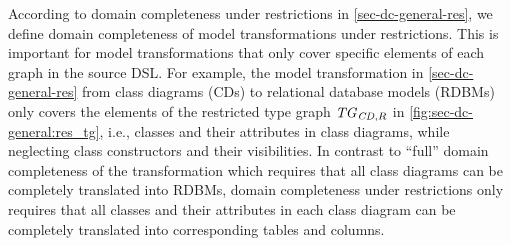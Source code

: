 % 
% 
% 
% 

According to domain completeness under restrictions in \cref{sec-dc-general-res}, we define domain completeness of model transformations under restrictions.
This is important for model transformations that only cover specific elements of each graph in the source DSL.
For example, the model transformation in \cref{sec-dc-general-res} from class diagrams (CDs) to relational database models (RDBMs) only covers the elements of the restricted type graph $\mathit{TG}_{\mathit{CD},R}$ in \cref{fig:sec-dc-general:res_tg}, i.e., classes and their attributes in class diagrams, while neglecting class constructors and their visibilities.
In contrast to ``full'' domain completeness of the transformation which requires that all class diagrams can be completely translated into RDBMs, domain completeness under restrictions only requires that all classes and their attributes in each class diagram can be completely translated into corresponding tables and columns.

